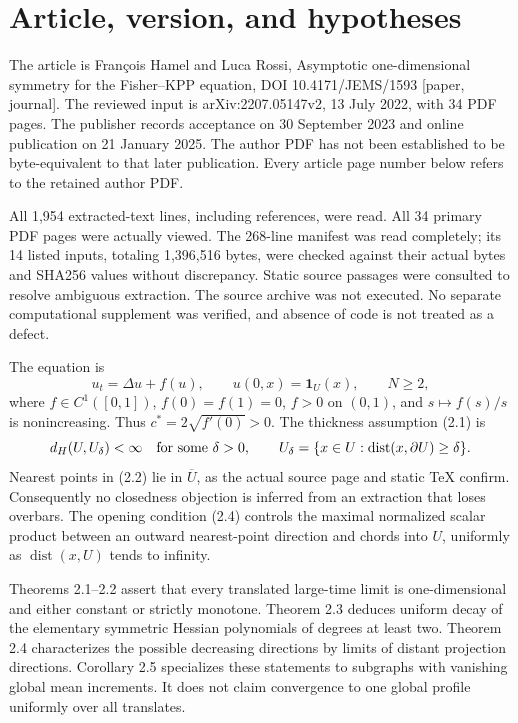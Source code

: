 \documentclass[10pt]{article}
\begin{document}
\section*{Article, version, and hypotheses}
The article is François Hamel and Luca Rossi, Asymptotic one-dimensional symmetry for the Fisher–KPP equation, DOI 10.4171/JEMS/1593 [paper, journal]. The reviewed input is arXiv:2207.05147v2, 13 July 2022, with 34 PDF pages. The publisher records acceptance on 30 September 2023 and online publication on 21 January 2025. The author PDF has not been established to be byte-equivalent to that later publication. Every article page number below refers to the retained author PDF.\par
All 1,954 extracted-text lines, including references, were read. All 34 primary PDF pages were actually viewed. The 268-line manifest was read completely; its 14 listed inputs, totaling 1,396,516 bytes, were checked against their actual bytes and SHA256 values without discrepancy. Static source passages were consulted to resolve ambiguous extraction. The source archive was not executed. No separate computational supplement was verified, and absence of code is not treated as a defect.\par
The equation is \[u_t=\Delta u+f(u),\qquad u(0,x)=\mathbf1_U(x),
 \qquad N\ge2,\] where \(f\in C^1([0,1])\), \(f(0)=f(1)=0\), \(f>0\) on \((0,1)\), and \(s\mapsto f(s)/s\) is nonincreasing. Thus \(c^*=2\sqrt{f'(0)}>0\). The thickness assumption (2.1) is \[d_H(U,U_\delta)<\infty
 \quad\hbox{for some }\delta>0,\qquad
 U_\delta=\{x\in U:\operatorname{dist}(x,\partial U)\ge\delta\}.\] Nearest points in (2.2) lie in \(\overline U\), as the actual source page and static TeX confirm. Consequently no closedness objection is inferred from an extraction that loses overbars. The opening condition (2.4) controls the maximal normalized scalar product between an outward nearest-point direction and chords into \(U\), uniformly as \(\operatorname{dist}(x,U)\) tends to infinity.\par
Theorems 2.1–2.2 assert that every translated large-time limit is one-dimensional and either constant or strictly monotone. Theorem 2.3 deduces uniform decay of the elementary symmetric Hessian polynomials of degrees at least two. Theorem 2.4 characterizes the possible decreasing directions by limits of distant projection directions. Corollary 2.5 specializes these statements to subgraphs with vanishing global mean increments. It does not claim convergence to one global profile uniformly over all translates.\par
\end{document}
